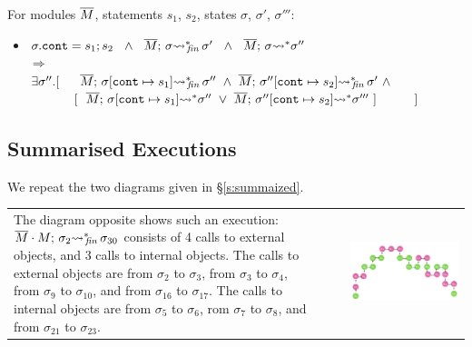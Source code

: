 {{\begin{auxLemma}
\label{lemma:subexp}
For modules $\overline{M}$, statements $s_1$, $s_2$,  states $\sigma$, $\sigma'$, $\sigma'''$:
\begin{itemize}
\item
$ \sigma.\texttt{cont} = s_1; s_2 \ \ \wedge\ \  \leadstoBoundedStarFin {\Mtwo}  {\sigma}  {\sigma'}\ \ 
\wedge \ \
\leadstoBoundedStar {\Mtwo}  {\sigma}  {\sigma''}\
$\\
$  \Longrightarrow$\\
$   \exists \sigma''.[\ \ \ \ \   \leadstoBoundedStarFin {\Mtwo} {\sigma[\texttt{cont}\mapsto s_1]}  {\sigma''}  
\ \wedge\ 
\leadstoBoundedStarFin {\Mtwo} {\sigma''[\texttt{cont}\mapsto s_2]}   {\sigma'} \  \wedge$
\\
$\strut \hspace{1.2cm}  [ \ \ \leadstoBoundedStar {\Mtwo} {\sigma[\texttt{cont}\mapsto s_1]}   {\sigma''}\ \vee \ \leadstoBoundedStar {\Mtwo}  {\sigma''[\texttt{cont}\mapsto s_2]}   {\sigma'''}\ ]\ \ \ \ \ \ \ \  \ ] $
\end{itemize}
\end{auxLemma}

\subsection{Summarised Executions}

We repeat the two diagrams given in \S \ref{s:summaized}.

\begin{tabular}{lll}
\begin{minipage}{.45\textwidth}
The diagram opposite  shows such an execution:
  $ \overline{M}\cdot M;\, {\sigma_2} {\rightsquigarrow^*}\!\!_{\mathit{fin}}\, \sigma_{30}$ consists of 4 calls to external objects,
and 3 calls to internal objects.
The calls to external objects are from $\sigma_2$ to $\sigma_3$,  from $\sigma_3$ to $\sigma_4$, from $\sigma_9$ to $\sigma_{10}$, 
and  from $\sigma_{16}$ to $\sigma_{17}$.
 The calls to internal objects are from $\sigma_5$ to $\sigma_6$, rom $\sigma_7$ to $\sigma_8$, and from $\sigma_{21}$ to $\sigma_{23}$. 
\end{minipage}
& \ \  &
\begin{minipage}{.4\textwidth}
\resizebox{6.2cm}{!}
{
\includegraphics[width=\linewidth]{diagrams/summaryA.png}
} \end{minipage}
\end{tabular}

}}
